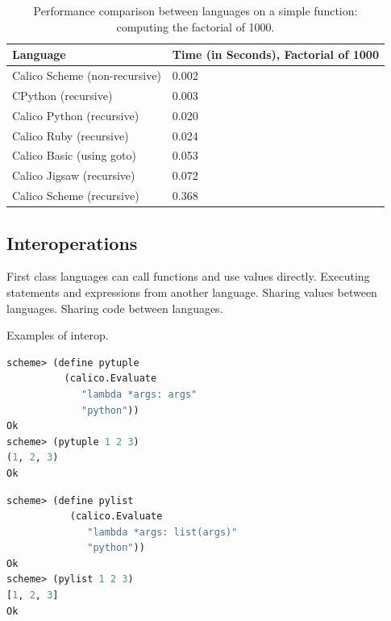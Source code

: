 \documentclass[preprint]{sigplanconf}
\begin{document}
\begin{table}[h!]\footnotesize
  \centering
  \begin{tabular}{ l | l }
    \hline                        
    \textbf{Language} & \textbf{Time (in Seconds), Factorial of 1000} \\
    \hline                        
    Calico Scheme (non-recursive) & 0.002 \\
    CPython (recursive)           & 0.003 \\
    Calico Python (recursive)     & 0.020 \\
    Calico Ruby (recursive)       & 0.024 \\
    Calico Basic (using goto)     & 0.053 \\
    Calico Jigsaw (recursive)     & 0.072 \\
    Calico Scheme (recursive)     & 0.368 \\
  \end{tabular}
  \caption{Performance comparison between languages on a simple
    function: computing the factorial of 1000.}
  \label{performance}
\end{table}

\subsection{Interoperations}

First class languages can call functions and use values
directly. Executing statements and expressions from another language.
Sharing values between languages.  Sharing code between languages.

Examples of interop.

\begin{lstlisting}[language=Lisp, morekeywords={define}, caption={Defining a function \texttt{pytuple} in 
      Calico Scheme that directly uses Calico Python's lambda to construct a Python tuple. Notice     
      that in line 7 that the tuple's representation reflects the style
      from Python.}, label={scheme1}]
scheme> (define pytuple 
          (calico.Evaluate 
             "lambda *args: args" 
             "python"))
Ok
scheme> (pytuple 1 2 3)
(1, 2, 3)
Ok
\end{lstlisting}


\begin{lstlisting}[language=Lisp, morekeywords={define}, caption={Defining a funtion \texttt{pylist} in Calico Scheme that creates a
    Python list.}, label={scheme2}]
scheme> (define pylist 
           (calico.Evaluate 
              "lambda *args: list(args)" 
              "python"))
Ok
scheme> (pylist 1 2 3)
[1, 2, 3]
Ok
\end{lstlisting}
\end{document}
